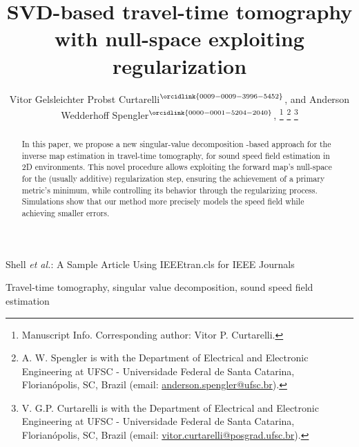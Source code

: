 \title{SVD-based travel-time tomography with null-space exploiting regularization}

\author{%
	Vitor Gelsleichter Probst Curtarelli$^{\orcidlink{0009-0009-3996-5452}}$, and Anderson Wedderhoff Spengler$^{\orcidlink{0000-0001-5204-2040}}$, 
	\thanks{\ieee Manuscript Info. Corresponding author: Vitor P. Curtarelli.}%
	\thanks{A. W. Spengler is with the Department of Electrical and Electronic Engineering at UFSC - Universidade Federal de Santa Catarina, Florianópolis, SC, Brazil (email: \url{anderson.spengler@ufsc.br}).}%
	\thanks{V. G.P. Curtarelli is with the Department of Electrical and Electronic Engineering at UFSC - Universidade Federal de Santa Catarina, Florianópolis, SC, Brazil (email: \url{vitor.curtarelli@posgrad.ufsc.br}).}%
}

%
{Shell \MakeLowercase{\textit{et al.}}: A Sample Article Using IEEEtran.cls for IEEE Journals}


\maketitle

\begin{abstract}	
	In this paper, we propose a new singular-value decomposition -based approach for the inverse map estimation in travel-time tomography, for sound speed field estimation in 2D environments. This novel procedure allows exploiting the forward map's null-space for the (usually additive) regularization step, ensuring the achievement of a primary metric's minimum, while controlling its behavior through the regularizing process. Simulations show that our method more precisely models the speed field while achieving smaller errors.
\end{abstract}

\begin{IEEEkeywords}
	Travel-time tomography, singular value decomposition, sound speed field estimation
\end{IEEEkeywords}